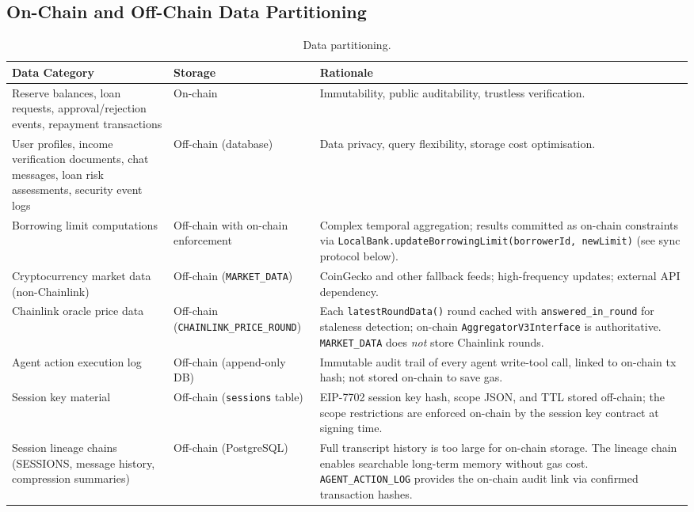 \subsection{On-Chain and Off-Chain Data Partitioning}
\label{sec:data-partitioning}

\begin{table}[H]
\centering
\footnotesize
\setlength{\tabcolsep}{3pt}
\renewcommand{\arraystretch}{1.05}
\caption[Data partitioning]{Data partitioning.}
\label{tab:data-partitioning}
\begin{tabular}{p{4.2cm}p{2.3cm}p{6.8cm}}
\toprule
\tableheadcolor
\textbf{Data Category} & \textbf{Storage} & \textbf{Rationale} \\
\midrule
Reserve balances, loan requests, approval/rejection events, repayment transactions & On-chain & Immutability, public auditability, trustless verification. \\
User profiles, income verification documents, chat messages, loan risk assessments, security event logs & Off-chain (database) & Data privacy, query flexibility, storage cost optimisation. \\
Borrowing limit computations & Off-chain with on-chain enforcement & Complex temporal aggregation; results committed as on-chain constraints via \texttt{LocalBank.updateBorrowingLimit(borrowerId, newLimit)} (see sync protocol below). \\
Cryptocurrency market data (non-Chainlink) & Off-chain (\texttt{MARKET\_DATA}) & CoinGecko and other fallback feeds; high-frequency updates; external API dependency. \\
Chainlink oracle price data & Off-chain (\texttt{CHAINLINK\_PRICE\_ROUND}) & Each \texttt{latestRoundData()} round cached with \texttt{answered\_in\_round} for staleness detection; on-chain \texttt{AggregatorV3Interface} is authoritative. \texttt{MARKET\_DATA} does \textit{not} store Chainlink rounds. \\
Agent action execution log & Off-chain (append-only DB) & Immutable audit trail of every agent write-tool call, linked to on-chain tx hash; not stored on-chain to save gas. \\
Session key material & Off-chain (\texttt{sessions} table) & EIP-7702 session key hash, scope JSON, and TTL stored off-chain; the scope restrictions are enforced on-chain by the session key contract at signing time. \\
Session lineage chains (SESSIONS, message history, compression summaries) & Off-chain (PostgreSQL) & Full transcript history is too large for on-chain storage. The lineage chain enables searchable long-term memory without gas cost. \texttt{AGENT\_ACTION\_LOG} provides the on-chain audit link via confirmed transaction hashes. \\
\bottomrule
\end{tabular}
\end{table}

